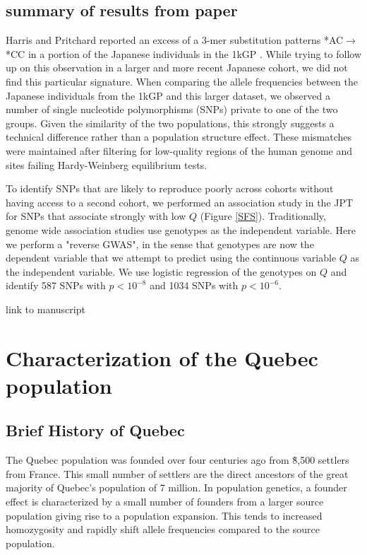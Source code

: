 \documentclass[
11pt, %
oneside, %
english, %
doublespacing, %
headsepline, %
]{MastersDoctoralThesis} %
\begin{document}
\section{summary of results from paper}
Harris and Pritchard reported an excess of a 3-mer substitution patterns *AC${\rightarrow}$*CC in a portion of the Japanese individuals in the 1kGP \citep{Harris2017a}.
While trying to follow up on this observation in a larger and more recent Japanese cohort, we did not find this particular signature.
When comparing the allele frequencies between the Japanese individuals from the 1kGP and this larger dataset, we observed a number of single nucleotide polymorphisms (SNPs) private to one of the two groups.
Given the similarity of the two populations, this strongly suggests a technical difference rather than a population structure effect.
These mismatches were maintained after filtering for low-quality regions of the human genome and sites failing Hardy-Weinberg equilibrium tests.

To identify SNPs that are likely to reproduce poorly across cohorts without having access to a second cohort, we performed an association study in the JPT for SNPs that associate strongly with low $Q$ (Figure \ref{SFS}).
Traditionally, genome wide association studies use genotypes as the independent variable. 
Here we perform a "reverse GWAS", in the sense that genotypes are now the dependent variable that we attempt to predict using the continuous variable $Q$ as the independent variable.
We use logistic regression of the genotypes on $Q$ and identify 587 SNPs with $p < 10^{-8}$ and 1034 SNPs with $ p < 10^{-6}$.


link to manuscript

\chapter{Characterization of the Quebec population}

\section{Brief History of Quebec}
The Quebec population was founded over four centuries ago from \~8,500 settlers from France.
This small number of settlers are the direct ancestors of the great majority of Quebec's population of 7 million.
In population genetics, a founder effect is characterized by a small number of founders from a larger source population giving rise to a population expansion.
This tends to increased homozygosity and rapidly shift allele frequencies compared to the source population.
\end{document}
